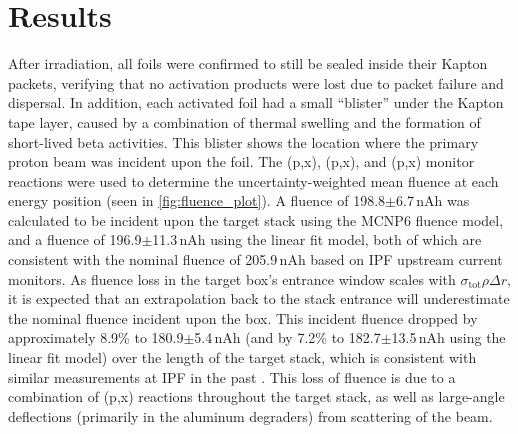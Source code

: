 \documentclass[3p]{elsarticle}
\newcommand{\comment}[1]{\todo[color=blue!20!white,inline]{ASV: #1}}
\begin{document}
% 




\section{Results}


After irradiation, all foils were confirmed to still be sealed inside their Kapton packets, verifying that no activation products were lost due to packet failure and dispersal.
In addition, each activated foil had a small \enquote{blister} under the Kapton tape layer, caused by a combination of thermal swelling and the formation of short-lived beta activities.
This blister   shows the location where the primary proton beam was incident upon the foil.
The (p,x), (p,x), and (p,x) monitor reactions were used to determine the uncertainty-weighted mean fluence at each energy position (seen in \autoref{fig:fluence_plot}).
A fluence of 198.8$\pm$6.7\,nAh was calculated to be incident upon the target stack using the MCNP6 fluence model, and a  fluence of 196.9$\pm$11.3\,nAh using the linear fit model, both of which are consistent with the nominal fluence of 205.9\,nAh based on IPF upstream current monitors.
As fluence loss in the target box's entrance window scales with $\sigma_{\mathrm{tot}}\rho\Delta r$, it is expected that an extrapolation back to the stack entrance will underestimate the nominal fluence incident upon the box.
This incident fluence dropped by approximately 8.9\% to  180.9$\pm$5.4\,nAh (and by 7.2\% to  182.7$\pm$13.5\,nAh using the linear fit model) over the length of the target stack, which is consistent with similar measurements at IPF in the past \cite{Graves2016}.
This loss of fluence is due to a combination of 
(p,x) reactions throughout the target stack, as well as large-angle deflections (primarily in the aluminum degraders) from scattering of the beam.
\end{document}
